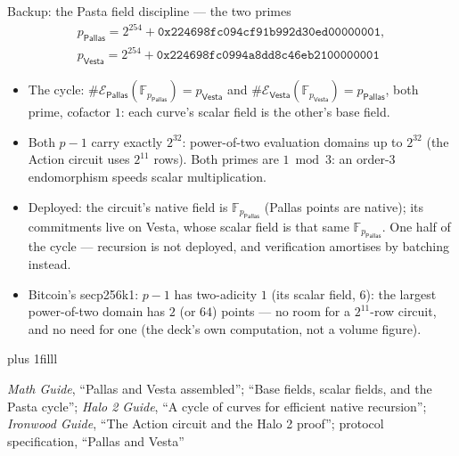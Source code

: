 \documentclass[aspectratio=169,11pt]{beamer}
\newcommand{\F}{\mathbb{F}}
\newcommand{\Ep}{\ensuremath{\mathcal{E}}}
\newcommand{\Pallas}{\ensuremath{\mathsf{Pallas}}}
\newcommand{\Vesta}{\ensuremath{\mathsf{Vesta}}}
\newcommand{\Fpp}{\ensuremath{\F_{p_{\Pallas}}}}
\newcommand{\Fpv}{\ensuremath{\F_{p_{\Vesta}}}}
\newcommand{\src}[1]{\par\vskip0pt plus 1filll
  {\fontsize{6}{7.2}\selectfont\color{arbdim}\raggedright #1\par}}
\begin{document}
\begin{frame}{Backup: the Pasta field discipline --- the two primes}
\vspace*{-6pt}
\setlength{\abovedisplayskip}{3pt}\setlength{\belowdisplayskip}{3pt}
\begin{gather*}
p_{\Pallas} = 2^{254} + \mathtt{0x224698fc094cf91b992d30ed00000001},\\
p_{\Vesta}  = 2^{254} + \mathtt{0x224698fc0994a8dd8c46eb2100000001}
\end{gather*}
\begin{itemize}\small
  \item The cycle: $\#\Ep_{\Pallas}(\Fpp) = p_{\Vesta}$ and
    $\#\Ep_{\Vesta}(\Fpv) = p_{\Pallas}$, both prime, cofactor $1$: each
    curve's scalar field is the other's base field.
  \item Both $p - 1$ carry exactly $2^{32}$: power-of-two evaluation
    domains up to $2^{32}$ (the Action circuit uses $2^{11}$ rows). Both
    primes are $1 \bmod 3$: an order-$3$ endomorphism speeds scalar
    multiplication.
  \item Deployed: the circuit's native field is \Fpp{} (Pallas points are
    native); its commitments live on Vesta, whose scalar field is that
    same \Fpp. One half of the cycle --- recursion is not deployed, and
    verification amortises by batching instead.
  \item Bitcoin's secp256k1: $p - 1$ has two-adicity $1$ (its scalar
    field, $6$): the largest power-of-two domain has $2$ (or $64$) points
    --- no room for a $2^{11}$-row circuit, and no need for one (the
    deck's own computation, not a volume figure).
\end{itemize}
\src{\emph{Math Guide}, ``Pallas and Vesta assembled''; ``Base fields, scalar
fields, and the Pasta cycle''; \emph{Halo 2 Guide}, ``A cycle of curves for
efficient native recursion''; \emph{Ironwood Guide}, ``The Action circuit and
the Halo 2 proof''; protocol specification, ``Pallas and Vesta''}
\end{frame}
\end{document}
